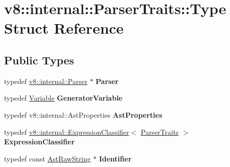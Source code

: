\hypertarget{structv8_1_1internal_1_1_parser_traits_1_1_type}{}\section{v8\+:\+:internal\+:\+:Parser\+Traits\+:\+:Type Struct Reference}
\label{structv8_1_1internal_1_1_parser_traits_1_1_type}
\subsection*{Public Types}
\begin{DoxyCompactItemize}
\item 
typedef \hyperlink{classv8_1_1internal_1_1_parser}{v8\+::internal\+::\+Parser} $\ast$ {\bfseries Parser}\hypertarget{structv8_1_1internal_1_1_parser_traits_1_1_type_a5178768bb5b327c475a769911e5cd90c}{}\label{structv8_1_1internal_1_1_parser_traits_1_1_type_a5178768bb5b327c475a769911e5cd90c}

\item 
typedef \hyperlink{classv8_1_1internal_1_1_variable}{Variable} {\bfseries Generator\+Variable}\hypertarget{structv8_1_1internal_1_1_parser_traits_1_1_type_aa4ebe05b5eeff7d7c16059be1fb7b96d}{}\label{structv8_1_1internal_1_1_parser_traits_1_1_type_aa4ebe05b5eeff7d7c16059be1fb7b96d}

\item 
typedef v8\+::internal\+::\+Ast\+Properties {\bfseries Ast\+Properties}\hypertarget{structv8_1_1internal_1_1_parser_traits_1_1_type_ac542bac602167f7f45669e607a5a37b5}{}\label{structv8_1_1internal_1_1_parser_traits_1_1_type_ac542bac602167f7f45669e607a5a37b5}

\item 
typedef \hyperlink{classv8_1_1internal_1_1_expression_classifier}{v8\+::internal\+::\+Expression\+Classifier}$<$ \hyperlink{classv8_1_1internal_1_1_parser_traits}{Parser\+Traits} $>$ {\bfseries Expression\+Classifier}\hypertarget{structv8_1_1internal_1_1_parser_traits_1_1_type_a5477d003f4e38596b98773debb833803}{}\label{structv8_1_1internal_1_1_parser_traits_1_1_type_a5477d003f4e38596b98773debb833803}

\item 
typedef const \hyperlink{classv8_1_1internal_1_1_ast_raw_string}{Ast\+Raw\+String} $\ast$ {\bfseries Identifier}\hypertarget{structv8_1_1internal_1_1_parser_traits_1_1_type_a2ec6cff126757a3c408c8e48fbffc60f}{}\label{structv8_1_1internal_1_1_parser_traits_1_1_type_a2ec6cff126757a3c408c8e48fbffc60f}


\end{DoxyCompactItemize}
